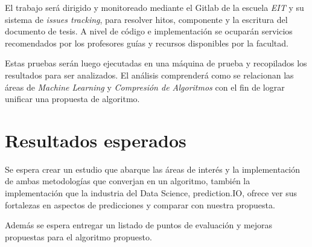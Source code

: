 \documentclass{udparticle}
\begin{document}
El trabajo será dirigido y monitoreado mediante el Gitlab de la escuela \emph{EIT} y su sistema de \emph{issues tracking}, para resolver hitos, componente y la escritura del documento de tesis. A nivel de código e implementación se ocuparán servicios recomendados por los profesores guías y recursos disponibles por la facultad.

Estas pruebas serán luego ejecutadas en una máquina de prueba y recopilados los resultados para ser analizados.
El análisis comprenderá como se relacionan las áreas de \emph{Machine Learning} y \emph{Compresión de Algoritmos} con el fin de lograr unificar una propuesta de algoritmo. 

\section{Resultados esperados}

Se espera crear un estudio que abarque las áreas de interés y la implementación de ambas metodologías que converjan en un algoritmo, 
también la implementación que la industria del Data Science, prediction.IO, ofrece ver sus fortalezas en aspectos de predicciones y comparar con nuestra propuesta.

Además se espera entregar un listado de puntos de evaluación y mejoras propuestas para el algoritmo propuesto.

\newpage
\end{document}

